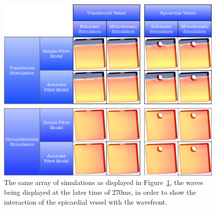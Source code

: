     \begin{figure}[htbp]
  		\centering
  	    \includegraphics[width=1\textwidth]{Ch5/Figs/planar_propagation_2}
              \caption{The same array of simulations as displayed in Figure~\ref{fig:planar_propagation_2}, the waves being displayed at the later time of 270ms, in order to show the interaction of the epicardial vessel with the wavefront.}
  	  \label{fig:planar_propagation_2}
  	\end{figure}


